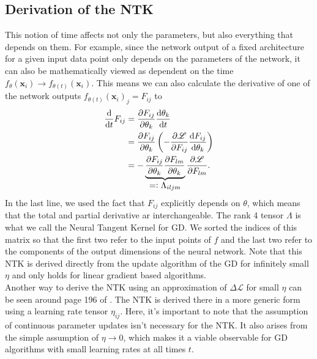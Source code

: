 \subsection{Derivation of the NTK}
This notion of time affects not only the parameters, but also everything that depends on them. For example, since the network output of a fixed architecture for a given input data point only depends on the parameters of the network, it can also be mathematically viewed as dependent on the time $f_{\theta}(\mathbf{x}_i) \rightarrow f_{\theta(t)}(\mathbf{x}_i)$. This means we can also calculate the derivative of one of the network outputs $f_{\theta(t)}(\mathbf{x}_i)_j = F_{ij}$ to
\begin{align}
	\tAbl{}{t} F_{ij} &= \pAbl{F_{ij}}{\theta_k}\tAbl{\theta_k}{t}\nonumber\\
	&= \pAbl{F_{ij}}{\theta_k} \left(- \pAbl{\mathscr{L}}{F_{ij}} \tAbl{F_{ij}}{\theta_k} \right)\label{eq:NTKarisesFromHere}\\
	&= - \underbrace{\pAbl{F_{ij}}{\theta_k} \pAbl{F_{lm}}{\theta_k}}_\mathlarger{=\vcentcolon \Lambda_{iljm}}
	\pAbl{\mathscr{L}}{F_{lm}}.\nonumber
\end{align}
In the last line, we used the fact that $F_{ij}$ explicitly depends on $\theta$, which means that the total and partial derivative ar interchangeable.
The rank 4 tensor $\Lambda$ is what we call the Neural Tangent Kernel for GD. We sorted the indices of this matrix so that the first two refer to the input points of $f$ and the last two refer to the components of the output dimensions of the neural network. Note that this NTK is derived directly from the update algorithm of the GD for infinitely small $\eta$ and only holds for linear gradient based algorithms.\\
Another way to derive the NTK using an approximation of $\Delta \mathscr{L}$ for small $\eta$ can be seen around page 196 of \cite{ThePrinciplesOfDeepLearningTheory}. The NTK is derived there in a more generic form using a learning rate tensor $\eta_{ij}$. Here, it's important to note that the assumption of continuous parameter updates isn't necessary for the NTK. It also arises from the simple assumption of $\eta \rightarrow 0$, which makes it a viable observable for GD algorithms with small learning rates at all times $t$. 